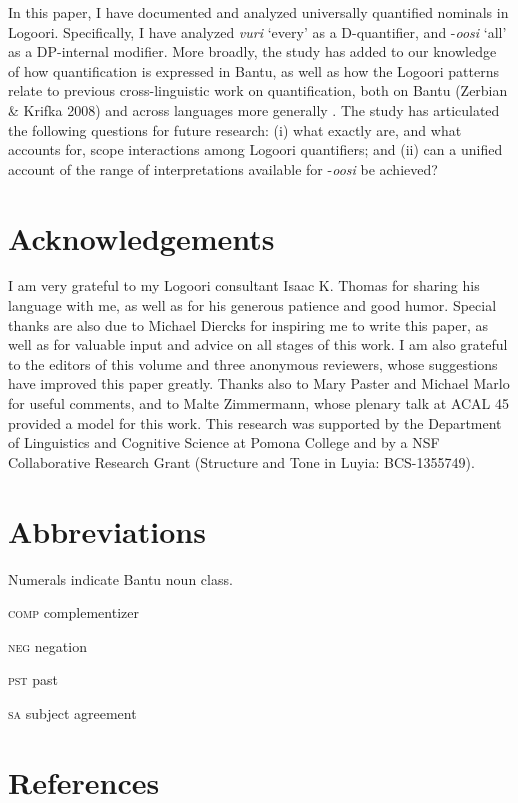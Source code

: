 \documentclass[output=paper]{langsci/langscibook}
\begin{document}
In this paper, I have documented and analyzed universally quantified nominals in Logoori. Specifically, I have analyzed \textit{vuri} ‘every’ as a D-quantifier, and -\textit{oosi} ‘all’ as a DP-internal modifier. More broadly, the study has added to our knowledge of how quantification is expressed in Bantu, as well as how the Logoori patterns relate to previous cross-linguistic work on quantification, both on Bantu (Zerbian \& Krifka 2008) and across languages more generally \citep{Matthewson2013}. The study has articulated the following questions for future research: (i) what exactly are, and what accounts for, scope interactions among Logoori quantifiers; and (ii) can a unified account of the range of interpretations available for -\textit{oosi} be achieved?

\chapter{Acknowledgements}

I am very grateful to my Logoori consultant Isaac K. Thomas for sharing his language with me, as well as for his generous patience and good humor. Special thanks are also due to Michael Diercks for inspiring me to write this paper, as well as for valuable input and advice on all stages of this work. I am also grateful to the editors of this volume and three anonymous reviewers, whose suggestions have improved this paper greatly. Thanks also to Mary Paster and Michael Marlo for useful comments, and to Malte Zimmermann, whose plenary talk at ACAL 45 provided a model for this work. This research was supported by the Department of Linguistics and Cognitive Science at Pomona College and by a NSF Collaborative Research Grant (Structure and Tone in Luyia: BCS-1355749).

\chapter{Abbreviations}

Numerals indicate Bantu noun class.

\textsc{comp}  complementizer

\textsc{neg}  negation

\textsc{pst}  past

\textsc{sa}  subject agreement

\chapter{References}
\end{document}
